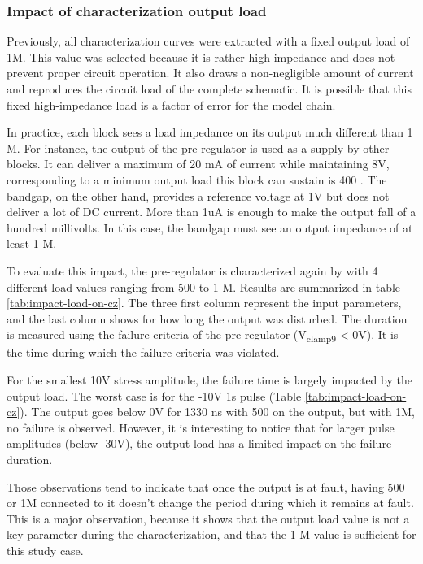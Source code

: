 \subsubsection{Impact of characterization output load}

Previously, all characterization curves were extracted with a fixed output load of 1M\textOmega{}.
This value was selected because it is rather high-impedance and does not prevent proper circuit operation.
It also draws a non-negligible amount of current and reproduces the circuit load of the complete schematic.
It is possible that this fixed high-impedance load is a factor of error for the model chain.

In practice, each block sees a load impedance on its output much different than 1 M\textOmega{}.
For instance, the output of the pre-regulator is used as a supply by other blocks.
It can deliver a maximum of 20 mA of current while maintaining 8V, corresponding to a minimum output load this block can sustain is 400 \textOmega{}.
The bandgap, on the other hand, provides a reference voltage at 1V but does not deliver a lot of DC current.
More than 1uA is enough to make the output fall of a hundred millivolts.
In this case, the bandgap must see an output impedance of at least 1 M\textOmega{}.

To evaluate this impact, the pre-regulator is characterized again by with 4 different load values ranging from 500 \textOmega{} to 1 M\textOmega{}.
Results are summarized in table \ref{tab:impact-load-on-cz}.
The three first column represent the input parameters, and the last column shows for how long the output was disturbed.
The duration is measured using the failure criteria of the pre-regulator (V\textsubscript{clamp9} < 0V).
It is the time during which the failure criteria was violated.

For the smallest 10V stress amplitude, the failure time is largely impacted by the output load.
The worst case is for the -10V 1\textmugreek{}s pulse (Table \ref{tab:impact-load-on-cz}).
The output goes below 0V for 1330 ns with 500\textOmega{} on the output, but with 1M\textOmega{}, no failure is observed.
However, it is interesting to notice that for larger pulse amplitudes (below -30V), the output load has a limited impact on the failure duration.

Those observations tend to indicate that once the output is at fault, having 500\textOmega{} or 1M\textOmega{} connected to it doesn't change the period during which it remains at fault.
This is a major observation, because it shows that the output load value is not a key parameter during the characterization, and that the 1 M\textOmega{} value is sufficient for this study case.

